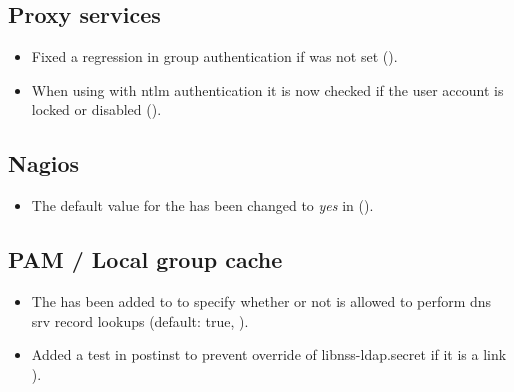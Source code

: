 \subsection{Proxy services}
\begin{itemize}
\item Fixed a regression in  group authentication if 
was not set ().
\item When using  with ntlm authentication it is now checked if the user account
is locked or disabled ().
\end{itemize}


\subsection{Nagios}
\begin{itemize}

\item The default value for the  has been
changed to \emph{yes} in  ().

\end{itemize}



\subsection{PAM / Local group cache}
\begin{itemize}
\item The  has been added to
 to specify whether or not 
is allowed to perform dns srv record lookups (default: true,
).
\item Added a test in  postinst to prevent override
of libnss-ldap.secret if it is a link ).
\end{itemize}

